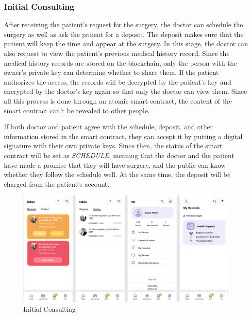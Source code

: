 \documentclass{article}
\begin{document}
\subsubsection{Initial Consulting}
After receiving the patient's request for the surgery, the doctor can schedule the surgery as well as ask the patient for a deposit. The deposit makes sure that the patient will keep the time and appear at the surgery. In this stage, the doctor can also request to view the patient's previous medical history record. Since the medical history records are stored on the blockchain, only the person with the owner's private key can determine whether to share them. If the patient authorizes the access, the records will be decrypted by the patient's key and encrypted by the doctor's key again so that only the doctor can view them. Since all this process is done through an atomic smart contract, the content of the smart contract can't be revealed to other people.
\par If both doctor and patient agree with the schedule, deposit, and other information stored in the smart contract, they can accept it by putting a digital signature with their own private keys. Since then, the status of the smart contract will be set as \emph{SCHEDULE}, meaning that the doctor and the patient have made a promise that they will have surgery, and the public can know whether they follow the schedule well. At the same time, the deposit will be charged from the patient's account.
\begin{figure}[H]
    \centering
    \includegraphics[scale=0.5]{InitialConsulting.jpg}
    \caption{Initial Consulting}
\end{figure}
\end{document}
